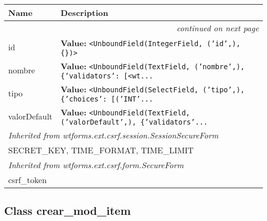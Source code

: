     \vspace{-1cm}
\hspace{\varindent}\begin{longtable}{|p{\varnamewidth}|p{\vardescrwidth}|l}
\cline{1-2}
\cline{1-2} \centering \textbf{Name} & \centering \textbf{Description}& \\
\cline{1-2}
\endhead\cline{1-2}\multicolumn{3}{r}{\small\textit{continued on next page}}\\\endfoot\cline{1-2}
\endlastfoot\raggedright i\-d\- & \raggedright \textbf{Value:} 
{\tt {\textless}UnboundField(IntegerField, ('id',), \{\}){\textgreater}}&\\
\cline{1-2}
\raggedright n\-o\-m\-b\-r\-e\- & \raggedright \textbf{Value:} 
{\tt {\textless}UnboundField(TextField, ('nombre',), \{'validators': [{\textless}wt\texttt{...}}&\\
\cline{1-2}
\raggedright t\-i\-p\-o\- & \raggedright \textbf{Value:} 
{\tt {\textless}UnboundField(SelectField, ('tipo',), \{'choices': [('INT'\texttt{...}}&\\
\cline{1-2}
\raggedright v\-a\-l\-o\-r\-D\-e\-f\-a\-u\-l\-t\- & \raggedright \textbf{Value:} 
{\tt {\textless}UnboundField(TextField, ('valorDefault',), \{'validators'\texttt{...}}&\\
\cline{1-2}
\multicolumn{2}{|l|}{\textit{Inherited from wtforms.ext.csrf.session.SessionSecureForm}}\\
\multicolumn{2}{|p{\varwidth}|}{\raggedright SECRET\_KEY, TIME\_FORMAT, TIME\_LIMIT}\\
\cline{1-2}
\multicolumn{2}{|l|}{\textit{Inherited from wtforms.ext.csrf.form.SecureForm}}\\
\multicolumn{2}{|p{\varwidth}|}{\raggedright csrf\_token}\\
\cline{1-2}
\end{longtable}



\subsection{Class crear\_mod\_item}


